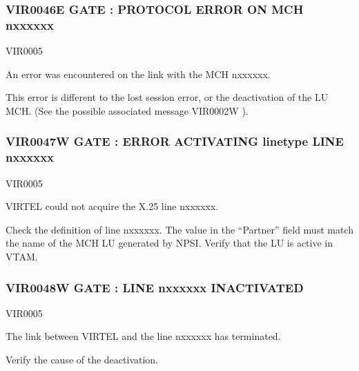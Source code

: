 \documentclass[letterpaper,10pt,english]{sphinxmanual}
\begin{document}
\subsubsection{VIR0046E GATE : PROTOCOL ERROR ON MCH n\sphinxhyphen{}xxxxxx}
\label{\detokenize{messages:vir0046e-gate-protocol-error-on-mch-n-xxxxxx}}\begin{description}
\sphinxAtStartPar
VIR0005

\sphinxAtStartPar
An error was encountered on the link with the MCH n\sphinxhyphen{}xxxxxx.

\sphinxAtStartPar
This error is different to the lost session error, or the deactivation of the LU MCH. (See the possible associated message VIR0002W ).

\end{description}


\subsubsection{VIR0047W GATE : ERROR ACTIVATING linetype LINE n\sphinxhyphen{}xxxxxx}
\label{\detokenize{messages:vir0047w-gate-error-activating-linetype-line-n-xxxxxx}}\begin{description}
\sphinxAtStartPar
VIR0005

\sphinxAtStartPar
VIRTEL could not acquire the X.25 line n\sphinxhyphen{}xxxxxx.

\sphinxAtStartPar
Check the definition of line n\sphinxhyphen{}xxxxxx. The value in the “Partner” field must match the name of the MCH LU generated by NPSI. Verify that the LU is active in VTAM.

\end{description}


\subsubsection{VIR0048W GATE : LINE n\sphinxhyphen{}xxxxxx INACTIVATED}
\label{\detokenize{messages:vir0048w-gate-line-n-xxxxxx-inactivated}}\begin{description}
\sphinxAtStartPar
VIR0005

\sphinxAtStartPar
The link between VIRTEL and the line n\sphinxhyphen{}xxxxxx has terminated.

\sphinxAtStartPar
Verify the cause of the deactivation.

\end{description}
\end{document}
